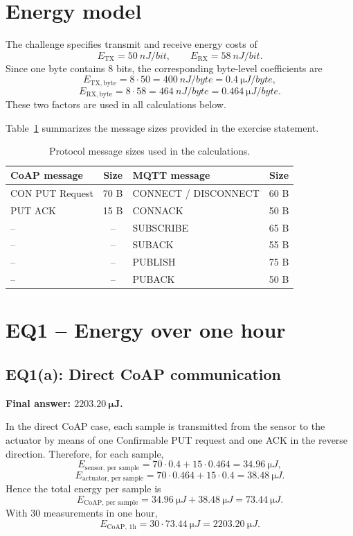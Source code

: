\documentclass[11pt,a4paper]{article}
\begin{document}
\section{Energy model}
The challenge specifies transmit and receive energy costs of
\[
E_{\mathrm{TX}} = 50~\si{nJ/bit},
\qquad
E_{\mathrm{RX}} = 58~\si{nJ/bit}.
\]
Since one byte contains 8 bits, the corresponding byte-level coefficients are
\[
E_{\mathrm{TX,byte}} = 8\cdot 50 = 400~\si{nJ/byte} = 0.4~\si{\micro J/byte},
\]
\[
E_{\mathrm{RX,byte}} = 8\cdot 58 = 464~\si{nJ/byte} = 0.464~\si{\micro J/byte}.
\]
These two factors are used in all calculations below.

Table~\ref{tab:sizes} summarizes the message sizes provided in the exercise statement.

\begin{table}[h!]
\centering
\caption{Protocol message sizes used in the calculations.}
\label{tab:sizes}
\begin{tabular}{lclc}
\toprule
\textbf{CoAP message} & \textbf{Size} & \textbf{MQTT message} & \textbf{Size} \\
\midrule
CON PUT Request & 70 B & CONNECT / DISCONNECT & 60 B \\
PUT ACK & 15 B & CONNACK & 50 B \\
-- & -- & SUBSCRIBE & 65 B \\
-- & -- & SUBACK & 55 B \\
-- & -- & PUBLISH & 75 B \\
-- & -- & PUBACK & 50 B \\
\bottomrule
\end{tabular}
\end{table}

\section{EQ1 -- Energy over one hour}

\subsection{EQ1(a): Direct CoAP communication}
\textbf{Final answer: \(\mathbf{2203.20~\si{\micro J}}\).}

In the direct CoAP case, each sample is transmitted from the sensor to the actuator by means of one Confirmable PUT request and one ACK in the reverse direction. Therefore, for each sample,
\[
E_{\text{sensor, per sample}} = 70\cdot 0.4 + 15\cdot 0.464 = \SI{34.96}{\micro J},
\]
\[
E_{\text{actuator, per sample}} = 70\cdot 0.464 + 15\cdot 0.4 = \SI{38.48}{\micro J}.
\]
Hence the total energy per sample is
\[
E_{\text{CoAP, per sample}} = \SI{34.96}{\micro J} + \SI{38.48}{\micro J} = \SI{73.44}{\micro J}.
\]
With 30 measurements in one hour,
\[
E_{\text{CoAP, 1h}} = 30\cdot\SI{73.44}{\micro J} = \boxed{\SI{2203.20}{\micro J}}.
\]
\end{document}
